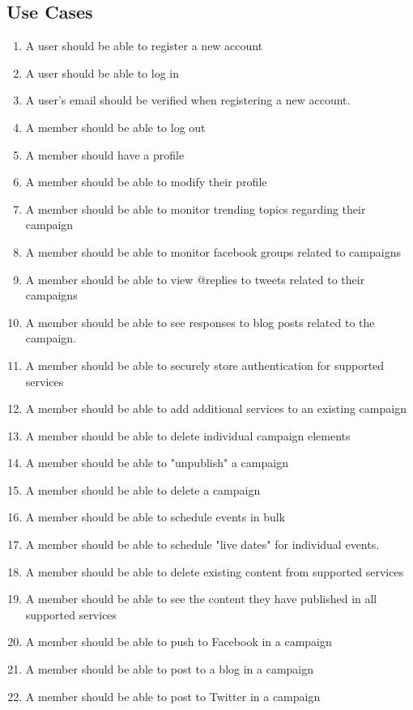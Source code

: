 \documentclass{article}
\begin{document}
\begin{description}
\section{Use Cases} %
\begin{enumerate}
\item A user should be able to register a new account
\item A user should be able to log in
\item A user's email should be verified when registering a new
  account.
\item A member should be able to log out
\item A member should have a profile
\item A member should be able to modify their profile
\item A member should be able to monitor trending topics regarding
  their campaign
\item A member should be able to monitor facebook groups related to
  campaigns
\item A member should be able to view @replies to tweets related to
  their campaigns
\item A member should be able to see responses to blog posts related
  to the campaign.
\item A member should be able to securely store authentication for supported
  services
\item A member should be able to add additional services to an
  existing campaign
\item A member should be able to delete individual campaign elements
\item A member should be able to "unpublish" a campaign
\item A member should be able to delete a campaign
\item A member should be able to schedule events in bulk
\item A member should be able to schedule "live dates" for individual
  events.
\item A member should be able to delete existing content from
  supported services
\item A member should be able to see the content they have published
  in all supported services
\item A member should be able to push to Facebook in a campaign
\item A member should be able to post to a blog in a campaign
\item A member should be able to post to Twitter in a campaign

\end{enumerate}
\end{description}
\end{document}
